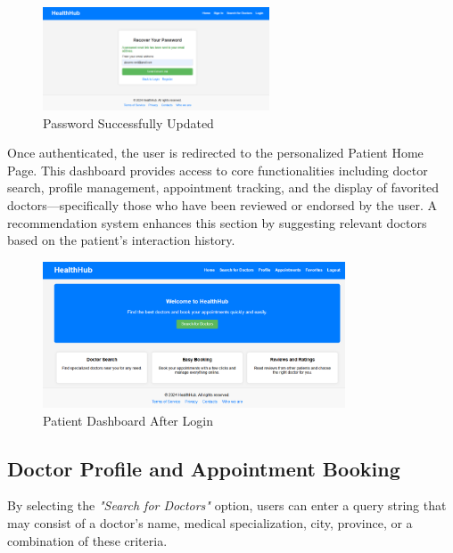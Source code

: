 \begin{figure}[H]
	\centering
	\includegraphics[width=0.6\textwidth]{resources/screenshots/patient_ui/recover3.png}
	\caption{Password Successfully Updated}
	\label{fig:recover3}
\end{figure}

Once authenticated, the user is redirected to the personalized Patient Home Page. This dashboard provides access to core functionalities including doctor search, profile management, appointment tracking, and the display of favorited doctors—specifically those who have been reviewed or endorsed by the user. A recommendation system enhances this section by suggesting relevant doctors based on the patient's interaction history.

\begin{figure}[H]
	\centering
	\includegraphics[width=0.8\textwidth]{resources/screenshots/patient_ui/logged-patient.png}
	\caption{Patient Dashboard After Login}
	\label{fig:logged-patient}
\end{figure}

\subsection{Doctor Profile and Appointment Booking}
By selecting the \textit{"Search for Doctors"} option, users can enter a query string that may consist of a doctor's name, medical specialization, city, province, or a combination of these criteria.

